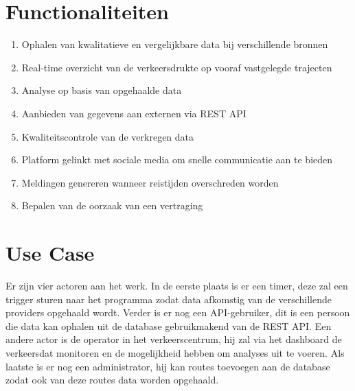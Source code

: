 \documentclass[ps,a4paper,oneside]{report}
\begin{document}
\section{Functionaliteiten}
\begin{enumerate}
\item Ophalen van kwalitatieve en vergelijkbare data bij verschillende bronnen
\item Real-time overzicht van de verkeersdrukte op vooraf vastgelegde trajecten
\item Analyse op basis van opgehaalde data
\item Aanbieden van gegevens aan externen via REST API
\item Kwaliteitscontrole van de verkregen data
\item Platform gelinkt met sociale media om snelle communicatie aan te bieden
\item Meldingen genereren wanneer reistijden overschreden worden
\item Bepalen van de oorzaak van een vertraging
\end{enumerate}
\section{Use Case}
Er zijn vier actoren aan het werk. In de eerste plaats is er een timer, deze zal een trigger sturen naar het programma zodat data afkomstig van de verschillende providers opgehaald wordt. Verder is er nog een API-gebruiker, dit is een persoon die data kan ophalen uit de database gebruikmakend van de REST API. Een andere actor is de operator in het verkeerscentrum, hij zal via het dashboard de verkeersdat monitoren en de mogelijkheid hebben om analyses uit te voeren. Als laatste is er nog een administrator, hij kan routes toevoegen aan de database zodat ook van deze routes data worden opgehaald.
\clearpage
\end{document}
